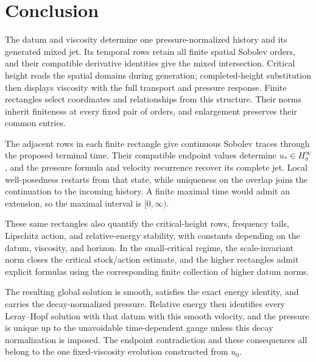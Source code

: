 \section{Conclusion}

The datum and viscosity determine one pressure-normalized history and its
generated mixed jet. Its temporal rows retain all finite spatial Sobolev
orders, and their compatible derivative identities give the mixed
intersection. Critical height reads the spatial domains during generation;
completed-height substitution then displays viscosity with the full
transport and pressure response. Finite rectangles select coordinates and
relationships from this structure. Their norms inherit finiteness at every
fixed pair of orders, and enlargement preserves their common entries.

The adjacent rows in each finite rectangle give continuous Sobolev traces
through the proposed terminal time.  Their compatible endpoint values determine
\(u_*\in H^\infty_\sigma\), and the pressure formula and velocity
recurrence recover its complete jet.  Local well-posedness restarts from
that state, while uniqueness on the overlap joins the continuation to the
incoming history.  A finite maximal time would admit an extension, so the
maximal interval is \([0,\infty)\).

These same rectangles also quantify the critical-height rows, frequency tails,
Lipschitz action, and relative-energy stability, with constants depending on
the datum, viscosity, and horizon.  In the small-critical regime, the
scale-invariant norm closes the critical stock/action estimate, and the higher
rectangles admit explicit formulas using the corresponding finite collection
of higher datum norms.

The resulting global solution is smooth, satisfies the exact energy identity,
and carries the decay-normalized pressure.  Relative energy then identifies
every Leray--Hopf solution with that datum with this smooth velocity, and
the pressure is unique up to the unavoidable time-dependent gauge unless this decay normalization is imposed.  The endpoint contradiction and these
consequences all belong to the one fixed-viscosity evolution constructed from
\(u_0\).
